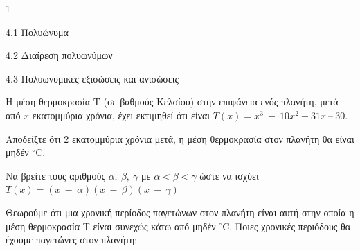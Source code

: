 \begin{ylh}{1}
\item 4.1 Πολυώνυμα
\item 4.2 Διαίρεση πολυωνύμων
\item 4.3 Πολυωνυμικές εξισώσεις και ανισώσεις
\end{ylh}
Η μέση θερμοκρασία Τ (σε βαθμούς Κελσίου) στην επιφάνεια ενός πλανήτη, μετά από $x$ εκατομμύρια χρόνια, έχει εκτιμηθεί ότι είναι $T(x) = x^{3}\  - \ 10x^{2} + 31x\ –\ 30$.
\begin{alist}
\item Αποδείξτε ότι 2 εκατομμύρια χρόνια μετά, η μέση θερμοκρασία στον πλανήτη θα είναι μηδέν $^\circ\text{C}$.
\item Να βρείτε τους αριθμούς $\alpha,\ \beta,\ \gamma$ με $\alpha < \beta < \gamma$ ώστε να ισχύει
$Τ(x) = (x\  - \ \alpha)(x\  - \ \beta)(x\  - \ \gamma)$
\item Θεωρούμε ότι μια χρονική περίοδος παγετώνων στον πλανήτη είναι αυτή στην οποία η μέση θερμοκρασία Τ είναι συνεχώς κάτω από μηδέν $^\circ\text{C}$. Ποιες χρονικές περιόδους θα έχουμε παγετώνες στον πλανήτη;
\end{alist}

